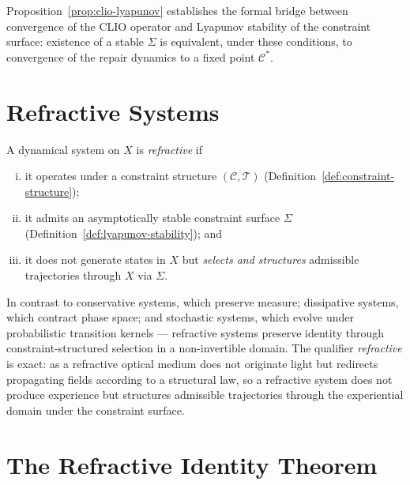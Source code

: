 \documentclass[11pt,openany]{book}
\begin{document}
\begin{remark}
Proposition~\ref{prop:clio-lyapunov} establishes the formal
bridge between convergence of the CLIO operator and
Lyapunov stability of the constraint surface: existence of a
stable $\Sigma$ is equivalent, under these conditions, to
convergence of the repair dynamics to a fixed point
$\mathcal{C}^*$.
\end{remark}

\section{Refractive Systems}
\label{sec:refractive-systems}

\begin{definition}
\label{def:refractive-system}
A dynamical system on $X$ is \emph{refractive} if
\begin{enumerate}[(i)]
  \item it operates under a constraint structure
    $(\mathcal{C}, \mathcal{T})$
    (Definition~\ref{def:constraint-structure});
  \item it admits an asymptotically stable constraint surface
    $\Sigma$ (Definition~\ref{def:lyapunov-stability}); and
  \item it does not generate states in $X$ but
    \emph{selects and structures} admissible trajectories
    through $X$ via $\Sigma$.
\end{enumerate}
In contrast to conservative systems, which preserve measure;
dissipative systems, which contract phase space; and
stochastic systems, which evolve under probabilistic
transition kernels --- refractive systems preserve identity
through constraint-structured selection in a non-invertible
domain.  The qualifier \emph{refractive} is exact: as a
refractive optical medium does not originate light but
redirects propagating fields according to a structural law,
so a refractive system does not produce experience but
structures admissible trajectories through the experiential
domain under the constraint surface.
\end{definition}

\section{The Refractive Identity Theorem}
\label{sec:theorem}
\end{document}
